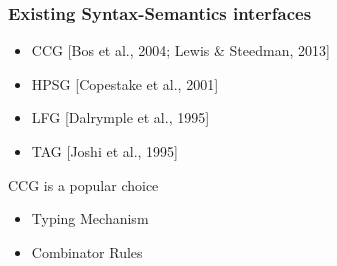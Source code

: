\documentclass[mathserif,12pt]{beamer}
\begin{document}
\begin{frame}
\frametitle{Existing Syntax-Semantics interfaces}
\large
 \begin{itemize}
  \vspace{0.5em}
  \item CCG {\scriptsize [Bos et al., 2004; Lewis \& Steedman, 2013]}
  
  \vspace{0.5em}
  \item HPSG {\scriptsize [Copestake et al., 2001]}
  
  \vspace{0.5em}
  \item LFG {\scriptsize [Dalrymple et al., 1995]}
  
  \vspace{0.5em}
  \item TAG {\scriptsize [Joshi et al., 1995]}
 \end{itemize}
 
 \vspace{0.5cm}
 
 CCG is a popular choice
 \begin{itemize}
   \item Typing Mechanism
   \item Combinator Rules
 \end{itemize}
\end{frame}
\end{document}
